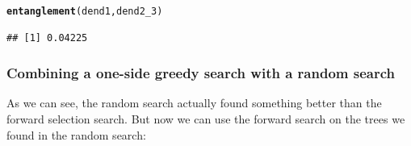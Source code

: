 \documentclass[shortnames,nojss,article]{jss}\usepackage[]{graphicx}\usepackage[]{color}
\makeatletter
\newcommand{\hlstd}[1]{\textcolor[rgb]{0.345,0.345,0.345}{#1}}%
\newcommand{\hlkwd}[1]{\textcolor[rgb]{0.737,0.353,0.396}{\textbf{#1}}}%
\newenvironment{kframe}{%
 \def\at@end@of@kframe{}%
 \ifinner\ifhmode%
  \def\at@end@of@kframe{\end{minipage}}%
  \begin{minipage}{\columnwidth}%
 \fi\fi%
 \def\FrameCommand##1{\hskip\@totalleftmargin \hskip-\fboxsep
 \colorbox{shadecolor}{##1}\hskip-\fboxsep
     \hskip-\linewidth \hskip-\@totalleftmargin \hskip\columnwidth}%
 \MakeFramed {\advance\hsize-\width
   \@totalleftmargin\z@ \linewidth\hsize
   \@setminipage}}%
 {\par\unskip\endMakeFramed%
 \at@end@of@kframe}
\newenvironment{knitrout}{}{} %
\makeatother
\begin{document}
\begin{knitrout}
{}


\begin{kframe}\begin{alltt}
\hlkwd{entanglement}\hlstd{(dend1, dend2_3)}
\end{alltt}
\begin{verbatim}
## [1] 0.04225
\end{verbatim}
\begin{alltt}

\end{alltt}
\end{kframe}
\end{knitrout}


\subsubsection{Combining a one-side greedy search with a random search}

As we can see, the random search actually found something better than the forward selection search. But now we can use the forward search on the trees we found in the random search:
\end{document}
